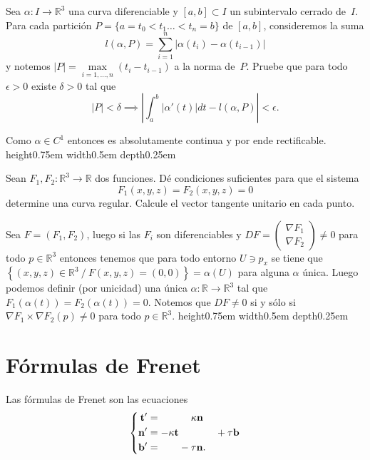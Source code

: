 \documentclass[11pt]{article}
\newcommand{\R}{{\mathbb{R}}}
\newcommand\abs[1]{\left\lvert#1\right\rvert}
\renewcommand\tt{\mathbf{t}}
\newcommand\nn{\mathbf{n}}
\newcommand\bb{\mathbf{b}}                      %
\newcommand{\sett}[1]{\left\lbrace#1\right\rbrace}
\newenvironment{proof}[1][Demostraci\'on]{\begin{trivlist}
		\item[\hskip \labelsep {\bfseries #1}]}{\end{trivlist}}
\newcommand{\qed}{\nobreak \ifvmode \relax \else
	\ifdim\lastskip<1.5em \hskip-\lastskip
	\hskip1.5em plus0em minus0.5em \fi \nobreak
	\vrule height0.75em width0.5em depth0.25em\fi}
\begin{document}
\begin{enumerate}
\begin{proof}
\begin{enumerate}
		\end{enumerate}
		
	\end{proof}
	
	\item Sea $\alpha:I\rightarrow \R^3$ una curva diferenciable y
	$[a,b]\subset I$ un subintervalo cerrado de~$I$. Para cada partici\'on
	$P=\{a=t_0<t_1\hdots<t_n=b\}$ de $[a,b]$, consideremos la suma
	\[
	l(\alpha,P)=\sum_{i=1}^n\abs{\alpha(t_i)-\alpha(t_{i-1})}
	\]
	y notemos $\abs{P}=\max\limits_{i=1,\hdots,n}(t_i-t_{i-1})$ a la norma
	de~$P$. Pruebe que para todo $\epsilon>0$ existe $\delta>0$ tal que
	\[
	\abs{P}<\delta
	\implies
	\abs{\int_a^b|\alpha'(t)|dt-l(\alpha,P)}<\epsilon.
 	\]
	
	\label{Ejercicio 6}
	
	\begin{proof}
		
		Como $\alpha \in C^1$ entonces es absolutamente continua y por ende rectificable. \qed 
		
	\end{proof}
	
	\item Sean $F_1, F_2: \R^3 \to \R$ dos funciones. D\'e condiciones suficientes para que el
	sistema
	\[
	F_1(x,y,z) = F_2(x,y,z) = 0
	\]
	determine una curva regular. Calcule el vector tangente unitario en cada punto.
	
	\label{Ejercicio 7}
	
	\begin{proof}
		Sea $F = (F_1,F_2)$, luego si las $F_i$ son diferenciables y $DF = \left(\begin{array}{c}
		\nabla F_1 \\
		\nabla F_2 
		\end{array}\right) \neq 0$ para todo $p \in \R^3$ entonces tenemos que para todo entorno $U \ni p_x$ se tiene que $\sett{(x,y,z) \in \R^3 \ / \ F(x,y,z) = (0,0)} = \alpha(U) $ para alguna $\alpha$ \'unica. Luego podemos definir (por unicidad) una \'unica $\alpha : \R \rightarrow \R^3$ tal que $F_1(\alpha(t)) = F_2(\alpha(t)) = 0$. Notemos que $DF \neq 0$ si y s\'olo si $\nabla F_1 \times \nabla F_2 (p) \neq 0$ para todo $p \in \R^3$. \qed 
	\end{proof}
	
	
	\section{F\'ormulas de Frenet}
	Las f\'ormulas de Frenet son las ecuaciones
	\[
	\left\{\begin{aligned}
	\tt' & = \hphantom{-\kappa \tt + {}} \kappa \nn \\
	\nn' & = -\kappa\tt \hphantom{{} + \kappa\nn + {}} +\tau \bb \\
	\bb' & = \hphantom{-\kappa \tt} -\tau \nn.
	\end{aligned}\right.
	\]
	

\end{enumerate}
\end{document}
